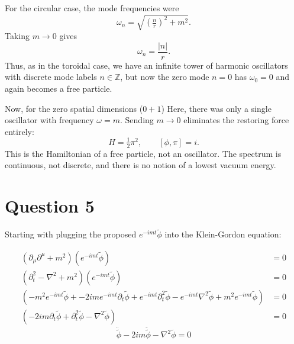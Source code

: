 \documentclass[12pt]{article}
\newcommand{\delmu}{\partial_{\mu}}
\newcommand{\delMu}{\partial^{\mu}}
\begin{document}
\noindent For the circular case, the mode frequencies were
\[
\omega_{n} = \sqrt{\left(\tfrac{n}{r}\right)^2 + m^2}.
\]
Taking $m \to 0$ gives
\[
\omega_{n} = \frac{|n|}{r}.
\]
Thus, as in the toroidal case, we have an infinite tower of harmonic oscillators
with discrete mode labels $n \in \mathbb Z$, but now the zero mode $n=0$ has 
$\omega_0 = 0$ and again becomes a free particle.

Now, for the zero spatial dimensions ($0+1$)
Here, there was only a single oscillator with frequency $\omega = m$. 
Sending $m \to 0$ eliminates the restoring force entirely:
\[
H = \tfrac{1}{2}\pi^2, \qquad [\phi,\pi]=i.
\]
This is the Hamiltonian of a free particle, not an oscillator. 
The spectrum is continuous, not discrete, and there is no notion of 
a lowest vacuum energy.

\section*{Question 5}
Starting with plugging the proposed $e^{-imt}\tilde{\phi}$ into the Klein-Gordon equation:

\begin{align*}
    (\delmu\delMu + m^2) (e^{-imt}\tilde{\phi}) &= 0 \\
    (\partial_t^2 - \nabla^2 + m^2)(e^{-imt}\tilde{\phi}) &= 0 \\
    (-m^2e^{-imt}\tilde{\phi} + -2ime^{-imt}\partial_t\tilde{\phi} + e^{-imt}\partial_t^2\tilde{\phi} - e^{-imt}\nabla^2\tilde{\phi} + m^2e^{-imt}\tilde{\phi}) &= 0 \\
    (-2im\partial_t\tilde{\phi} + \partial_t^2\tilde{\phi} - \nabla^2\tilde{\phi}) &= 0 
\end{align*}
\begin{equation}
    \boxed{\ddot{\tilde{\phi}} - 2im\ddot{\tilde{\phi}}  -\nabla^2\tilde{\phi} = 0}
\end{equation}
\end{document}
